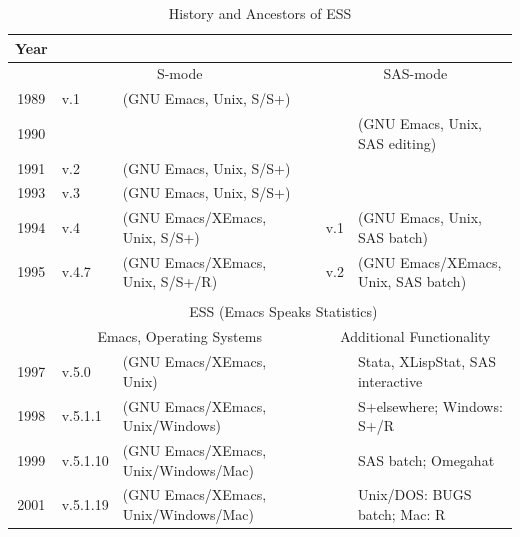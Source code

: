 \documentclass{article}
\newcommand*{\SAS}{\textsc{SAS}}
\newcommand*{\Splus}{\textsc{S-Plus}}
\begin{document}
\begin{table}[tbp]
  \centering
  \begin{tabular}{c ll c ll}
\hline
    Year  \\ 
\hline
         & \multicolumn{2}{c}{S-mode}       && \multicolumn{2}{c}{SAS-mode} \\ 
\cline{2-3} \cline{5-6}
    1989 & v.1 & (GNU Emacs, Unix, S/S+)        &&  \\
    1990 &     &                            &&     & (GNU Emacs, Unix, SAS editing) \\
    1991 & v.2 & (GNU Emacs, Unix, S/S+)        && \\
    1993 & v.3 & (GNU Emacs, Unix, S/S+)        && \\
    1994 & v.4 & (GNU Emacs/XEmacs, Unix, S/S+) && v.1  & (GNU Emacs, Unix, SAS batch) \\
    1995 & v.4.7 & (GNU Emacs/XEmacs, Unix, S/S+/R) && v.2 & (GNU Emacs/XEmacs, Unix, SAS batch) \\
    \cline{2-6}\\[-3.5ex]
    \cline{2-6}
         & \multicolumn{5}{c}{ESS (Emacs Speaks Statistics)} \\
    \cline{2-6} 
         &\multicolumn{2}{c}{Emacs, Operating Systems} &&\multicolumn{2}{c}{Additional Functionality}\\
\cline{2-3} \cline{5-6}
    1997 & v.5.0 & (GNU Emacs/XEmacs, Unix)         &&&  Stata, XLispStat, SAS interactive \\
    1998 & v.5.1.1 & (GNU Emacs/XEmacs, Unix/Windows) &&&  S+elsewhere; Windows: S+/R\\
    1999 & v.5.1.10 & (GNU Emacs/XEmacs, Unix/Windows/Mac) &&& SAS batch; Omegahat \\
    2001 & v.5.1.19 & (GNU Emacs/XEmacs, Unix/Windows/Mac) &&& Unix/DOS: BUGS batch; Mac: R \\
\hline
  \end{tabular}
  \caption{History and Ancestors of ESS}
  \label{tab:timeline}
\end{table}


\end{document}
